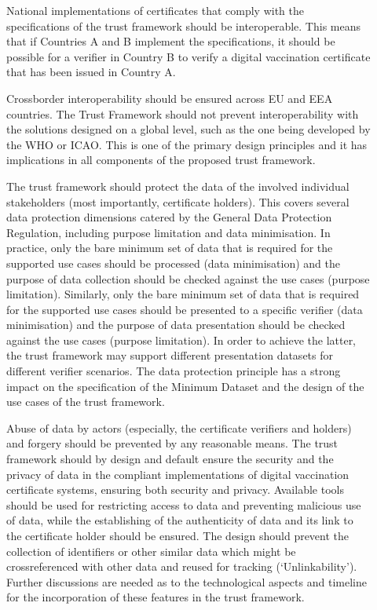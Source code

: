 \documentclass[a4paper,12pt,english]{sphinxhowto}
\begin{document}
\begin{description}
\item[{}] \leavevmode
\sphinxAtStartPar
National implementations of certificates that comply with the specifications of the trust framework should be interoperable. This means that if Countries A and B implement the specifications, it should be possible for a verifier in Country B to verify a digital vaccination certificate that has been issued in Country A.

\sphinxAtStartPar
Cross\sphinxhyphen{}border interoperability should be ensured across EU and EEA countries. The Trust Framework should not prevent interoperability with the solutions designed on a global level, such as the one being developed by the WHO or ICAO. This is one of the primary design principles and it has implications in all components of the proposed trust framework.

\item[{}] \leavevmode
\sphinxAtStartPar
The trust framework should protect the data of the involved individual stakeholders (most importantly, certificate holders). This covers several data protection dimensions catered by the General Data Protection Regulation, including purpose limitation and data minimisation. In practice, only the bare minimum set of data that is required for the supported use cases should be processed (data minimisation) and the purpose of data collection should be checked against the use cases (purpose limitation). Similarly, only the bare minimum set of data that is required for the supported use cases should be presented to a specific verifier (data minimisation) and the purpose of data presentation should be checked against the use cases (purpose limitation). In order to achieve the latter, the trust framework may support different presentation datasets for different verifier scenarios. The data protection principle has a strong impact on the specification of the Minimum Dataset and the design of the use cases of the trust framework.

\item[{}] \leavevmode
\sphinxAtStartPar
Abuse of data by actors (especially, the certificate verifiers and holders) and forgery should be prevented by any reasonable means. The trust framework should by design and default ensure the security and the privacy of data in the compliant implementations of digital vaccination certificate systems, ensuring both security and privacy. Available tools should be used for restricting access to data and preventing malicious use of data, while the establishing of the authenticity of data and its link to the certificate holder should be ensured. The design should prevent the collection of identifiers or other similar data which might be crossreferenced with other data and re\sphinxhyphen{}used for tracking (‘Unlinkability’). Further discussions are needed as to the technological aspects and timeline for the incorporation of these features in the trust framework.


\end{description}
\end{document}
